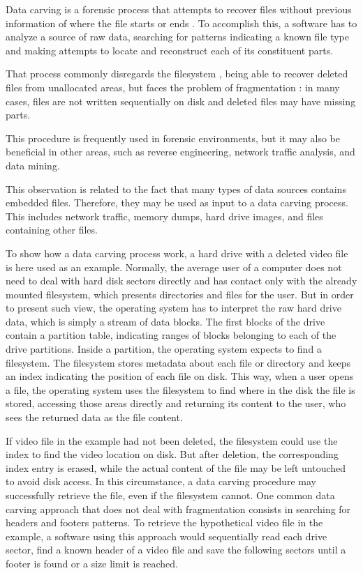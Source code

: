 Data carving is a forensic process that attempts to recover files without previous information of where the file starts or ends \cite{garfinkel_carving_2007}.
To accomplish this, a software has to analyze a source of raw data, searching for patterns indicating a known file type and making attempts to locate and reconstruct each of its constituent parts.

That process commonly disregards the filesystem \cite{veenman_statistical_2007}, being able to recover deleted files from unallocated areas, but faces the problem of fragmentation \cite{veenman_statistical_2007}  \cite{pal_evolution_2009}: in many cases, files are not written sequentially on disk and deleted files may have missing parts.

This procedure is frequently used in forensic environments, but it may also be beneficial in other areas, such as reverse engineering, network traffic analysis, and data mining.

This observation is related to the fact that many types of data sources contains embedded files. Therefore, they may be used as input to a data carving process. This includes network traffic, memory dumps, hard drive images, and files containing other files.

To show how a data carving process work, a hard drive with a deleted video file is here used as an example.
Normally, the average user of a computer does not need to deal with hard disk sectors directly and has contact only with the already mounted filesystem, which presents directories and files for the user. But in order to present such view, the operating system has to interpret the raw hard drive data, which is simply a stream of data blocks. The first blocks of the drive contain a partition table, indicating ranges of blocks belonging to each of the drive partitions. Inside a partition, the operating system expects to find a filesystem. The filesystem stores metadata about each file or directory and keeps an index indicating the position of each file on disk. This way, when a user opens a file, the operating system uses the filesystem to find where in the disk the file is stored, accessing those areas directly and returning its content to the user, who sees the returned data as the file content. 
 
If video file in the example had not been deleted, the filesystem could use the index to find the video location on disk. But after deletion, the corresponding index entry is erased, while the actual content of the file may be left untouched to avoid disk access. In this circumstance, a data carving procedure may successfully retrieve the file, even if the filesystem cannot. One common data carving approach that does not deal with fragmentation consists in searching for headers and footers patterns. To retrieve the hypothetical video file in the example, a software using this approach would sequentially read each drive sector, find a known header of a video file and save the following sectors until a footer is found or a size limit is reached. 
 
